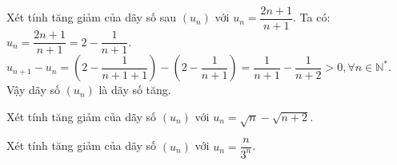\begin{bt}%

	Xét tính tăng giảm của dãy số sau $(u_n)$ với $u_n=\dfrac{2n+1}{n+1}$.
	\loigiai
	{
		Ta có: $u_n=\dfrac{2n+1}{n+1}=2-\dfrac{1}{n+1}$.\\
		$u_{n+1}-u_n=\left(2-\dfrac{1}{n+1+1}\right)-\left(2-\dfrac{1}{n+1}\right)=\dfrac{1}{n+1}-\dfrac{1}{n+2}>0, \forall n \in \mathbb{N}^\ast$.\\
		Vậy dãy số $(u_n)$ là dãy số tăng.
	}
\end{bt}

\begin{bt}%

	Xét tính tăng giảm của dãy số $(u_n)$ với $u_n=\sqrt{n}-\sqrt{n+2}$.
\end{bt}

\begin{bt}%

	Xét tính tăng giảm của dãy số $(u_n)$ với $u_n=\dfrac{n}{3^n}$.
\end{bt}

